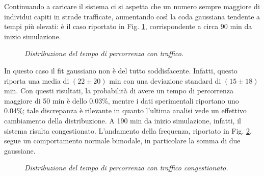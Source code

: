 \documentclass[../main.tex]{subfiles}
\begin{document}
Continuando a caricare il sistema ci si aspetta che un numero sempre maggiore di individui capiti in strade trafficate, aumentando cos\`i la coda gaussiana tendente a tempi pi\`u elevati: \`e il caso riportato in Fig. \ref{fig:frequency_flow}, corrispondente a circa 90 min da inizio simulazione.
\begin{figure}[H]
    \centering
    \caption[Distribuzione del tempo di percorrenza con traffico]{\emph{Distribuzione del tempo di percorrenza con traffico.}}
    \label{fig:frequency_flow}
\end{figure}
In questo caso il fit gaussiano non \`e del tutto soddisfacente. Infatti, questo riporta una media di $(22 \pm 20)$ min con una deviazione standard di $(15 \pm 18)$ min.
Con questi risultati, la probabilit\`a di avere un tempo di percorrenza maggiore di 50 min \`e dello 0.03\%, mentre i dati sperimentali riportano uno 0.04\%; tale discrepanza \`e rilevante in quanto l'ultima analisi vede un effettivo cambiamento della distribuzione.
A 190 min da inizio simulazione, infatti, il sistema risulta congestionato.
L'andamento della frequenza, riportato in Fig. \ref{fig:frequency_congested_flow}, segue un comportamento normale bimodale, in particolare la somma di due gaussiane.
\begin{figure}[H]
    \centering
    \caption[Distribuzione del tempo di percorrenza con traffico congestionato]{\emph{Distribuzione del tempo di percorrenza con traffico congestionato.}}
    \label{fig:frequency_congested_flow}
\end{figure}
\end{document}
